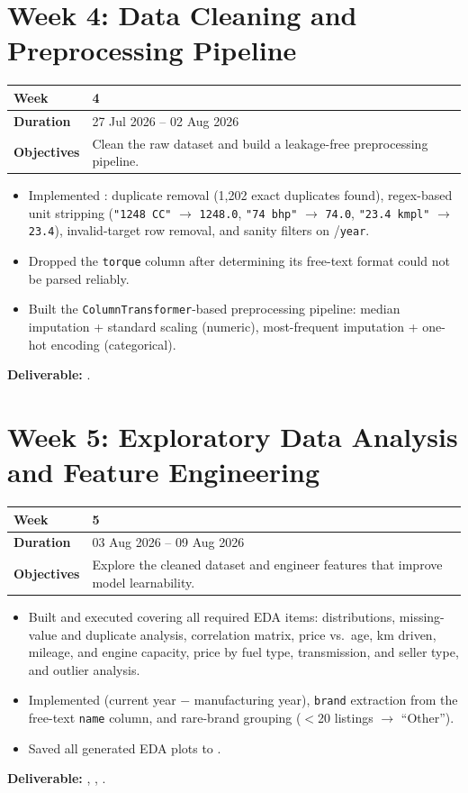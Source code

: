 \documentclass[12pt,a4paper]{report}
\newcommand{\weektable}[3]{%
\begin{longtable}{|p{3.6cm}|p{10.5cm}|}
\hline
\textbf{Week} & \textbf{#1} \\
\hline
\textbf{Duration} & #2 \\
\hline
\textbf{Objectives} & #3 \\
\hline
\end{longtable}
}
\begin{document}
\chapter{Week 4: Data Cleaning and Preprocessing Pipeline}
\weektable{4}{27 Jul 2026 -- 02 Aug 2026}{Clean the raw dataset and build a leakage-free preprocessing pipeline.}

\begin{itemize}[nosep]
    \item Implemented : duplicate removal (1{,}202 exact duplicates found), regex-based unit stripping (\texttt{"1248 CC"} $\to$ \texttt{1248.0}, \texttt{"74 bhp"} $\to$ \texttt{74.0}, \texttt{"23.4 kmpl"} $\to$ \texttt{23.4}), invalid-target row removal, and sanity filters on /\texttt{year}.
    \item Dropped the \texttt{torque} column after determining its free-text format could not be parsed reliably.
    \item Built the \texttt{ColumnTransformer}-based preprocessing pipeline: median imputation + standard scaling (numeric), most-frequent imputation + one-hot encoding (categorical).
\end{itemize}
\textbf{Deliverable:} .

\chapter{Week 5: Exploratory Data Analysis and Feature Engineering}
\weektable{5}{03 Aug 2026 -- 09 Aug 2026}{Explore the cleaned dataset and engineer features that improve model learnability.}

\begin{itemize}[nosep]
    \item Built and executed  covering all required EDA items: distributions, missing-value and duplicate analysis, correlation matrix, price vs.\ age, km driven, mileage, and engine capacity, price by fuel type, transmission, and seller type, and outlier analysis.
    \item Implemented  (current year $-$ manufacturing year), \texttt{brand} extraction from the free-text \texttt{name} column, and rare-brand grouping ($<$20 listings $\to$ ``Other'').
    \item Saved all generated EDA plots to .
\end{itemize}
\textbf{Deliverable:} , , .
\end{document}
